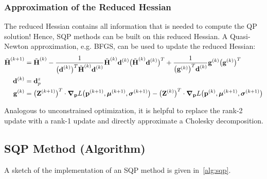 			\subsubsection{Approximation of the Reduced Hessian}
				The reduced Hessian contains all information that is needed to compute the QP solution! Hence, SQP methods can be built on this reduced Hessian. A Quasi-Newton approximation, e.g. BFGS, can be used to update the reduced Hessian:
				\begin{align*}
					\tilde{\boldsymbol{\mathrm{H}}}^{(k + 1)} &= \tilde{\boldsymbol{\mathrm{H}}}^{(k)}
							- \frac{1}{\big(\boldsymbol{\mathrm{d}}^{(k)}\big)^T \tilde{\boldsymbol{\mathrm{H}}}^{(k)} \boldsymbol{\mathrm{d}}^{(k)}} \tilde{\boldsymbol{\mathrm{H}}}^{(k)} \boldsymbol{\mathrm{d}}^{(k)} \big(\tilde{\boldsymbol{\mathrm{H}}}^{(k)} \boldsymbol{\mathrm{d}}^{(k)}\big)^T
							+ \frac{1}{\big(\boldsymbol{\mathrm{g}}^{(k)}\big)^T \boldsymbol{\mathrm{d}}^{(k)}} \boldsymbol{\mathrm{g}}^{(k)} \big(\boldsymbol{\mathrm{g}}^{(k)}\big)^T \\
					\boldsymbol{\mathrm{d}}^{(k)} &= \boldsymbol{\mathrm{d}}_p^z \\
					\boldsymbol{\mathrm{g}}^{(k)} &= \big(\boldsymbol{\mathrm{Z}}^{(k + 1)}\big)^T \cdot \grad_{\boldsymbol{\mathrm{p}}}L\big(\boldsymbol{\mathrm{p}}^{(k + 1)}, \boldsymbol{\mathrm{\mu}}^{(k + 1)}, \boldsymbol{\mathrm{\sigma}}^{(k + 1)}\big) - \big(\boldsymbol{\mathrm{Z}}^{(k)}\big)^T \cdot \grad_{\boldsymbol{\mathrm{p}}}L\big(\boldsymbol{\mathrm{p}}^{(k)}, \boldsymbol{\mathrm{\mu}}^{(k + 1)}, \boldsymbol{\mathrm{\sigma}}^{(k + 1)}\big)
				\end{align*}
				
				Analogous to unconstrained optimization, it is helpful to replace the rank-2 update with a rank-1 update and directly approximate a Cholesky decomposition.

		\subsection{SQP Method (Algorithm)}
			A sketch of the implementation of an SQP method is given in~\autoref{alg:sqp}.
			
